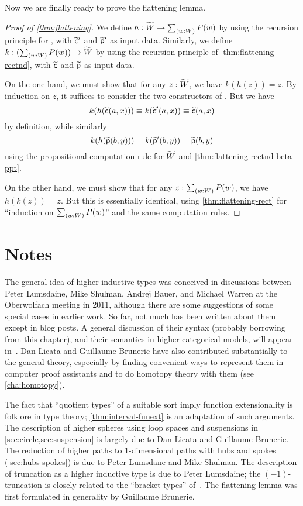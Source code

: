 Now we are finally ready to prove the flattening lemma.

\begin{proof}[Proof of \autoref{thm:flattening}]
  We define $h:\Wtil \to \sm{w:W}P(w)$ by using the recursion principle for \Wtil, with $\widetilde{\mathsf{c}}'$ and $\widetilde{\mathsf{p}}'$ as input data.
  Similarly, we define $k:(\sm{w:W}P(w)) \to \Wtil$ by using the recursion principle of \autoref{thm:flattening-rectnd}, with $\widetilde{\mathsf{c}}$ and $\widetilde{\mathsf{p}}$ as input data.

  On the one hand, we must show that for any $z:\widetilde{W}$, we have $k(h(z))=z$.
  By induction on $z$, it suffices to consider the two constructors of \Wtil.
  But we have
  \[k(h(\widetilde{\mathsf{c}}(a,x))) \equiv k(\widetilde{\mathsf{c}}'(a,x)) \equiv \widetilde{\mathsf{c}}(a,x)\]
  by definition, while similarly
  \[{k}({{h}({\widetilde{\mathsf{p}}(b,y)})}) = {k}({\widetilde{\mathsf{p}}'(b,y)}) = \widetilde{\mathsf{p}}(b,y) \]
  using the propositional computation rule for $\widetilde{W}$ and \autoref{thm:flattening-rectnd-beta-ppt}.

  On the other hand, we must show that for any $z:\sm{w:W}P(w)$, we have $h(k(z))=z$.
  But this is essentially identical, using \autoref{thm:flattening-rect} for ``induction on $\sm{w:W}P(w)$'' and the same computation rules.
\end{proof}


\section*{Notes}

The general idea of higher inductive types was conceived in discussions between Peter Lumsdaine, Mike Shulman, Andrej Bauer, and Michael Warren at the Oberwolfach meeting in 2011, although there are some suggestions of some special cases in earlier work.
So far, not much has been written about them except in blog posts.
A general discussion of their syntax (probably borrowing from this chapter), and their semantics in higher-categorical models, will appear in~\cite{ls:hits}.
Dan Licata and Guillaume Brunerie have also contributed substantially to the general theory, especially by finding convenient ways to represent them in computer proof assistants and to do homotopy theory with them (see \autoref{cha:homotopy}).

The fact that ``quotient types'' of a suitable sort imply function extensionality is folklore in type theory; \autoref{thm:interval-funext} is an adaptation of such arguments.
The description of higher spheres using loop spaces and suspensions in \autoref{sec:circle,sec:suspension} is largely due to Dan Licata and Guillaume Brunerie.
The reduction of higher paths to 1-dimensional paths with hubs and spokes (\autoref{sec:hubs-spokes}) is due to Peter Lumsdane and Mike Shulman.
The description of truncation as a higher inductive type is due to Peter Lumsdaine; the $(-1)$-truncation is closely related to the ``bracket types'' of~\cite{ab:bracket-types}.
The flattening lemma was first formulated in generality by Guillaume Brunerie.


